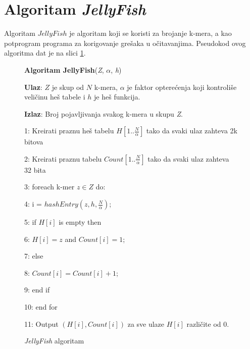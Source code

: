 \documentclass[12pt,oneside]{memoir}
\begin{document}
\section{Algoritam \textit{JellyFish}}
\label{odeljak:JellyFish}

Algoritam $JellyFish$ je algoritam koji se koristi za brojanje k-mera, a kao potprogram programa za korigovanje grešaka u očitavanjima. Pseudokod ovog algoritma dat je na slici \ref{box:jellyfish}.

\begin{comment}

\begin{figure}[!ht]
  \centering
  \texttt{[image: Jellyfish.PNG]}
  \caption{Algoritam Jellyfish \cite{WingKinSung}}
  \label{fig:jellyfish}
\end{figure}

\end{comment}

\begin{figure}[!ht]
\begin{tcolorbox}
\textbf{Algoritam JellyFish}(\textit{Z}, $\alpha$, \textit{h})

\textbf{Ulaz}: $Z$ je skup od $N$ k-mera, $\alpha$ je faktor opterećenja koji kontroliše veličinu heš tabele i $h$ je heš funkcija.

\textbf{Izlaz}: Broj pojavljivanja svakog k-mera u skupu \textit{Z}.

1: Kreirati praznu heš tabelu $H[1..\frac{N}{\alpha}]$ tako da svaki ulaz zahteva 2k bitova

2: Kreirati praznu tabelu $Count[1..\frac{N}{\alpha}]$ tako da svaki ulaz zahteva 32 bita 

3: foreach k-mer $z \in Z$ do:

4:\hspace{1cm} i = $hashEntry(z, h, \frac{N}{\alpha})$;
    
5:\hspace{1cm} if $H[i]$ is empty then

6:\hspace{2cm} $H[i] = z$ and $Count[i] = 1$;

7:\hspace{1cm} else 

8:\hspace{2cm} $Count[i] = Count[i] + 1$;

9:\hspace{1cm} end if

10: end for

11: Output $(H[i], Count[i])$ za sve ulaze $H[i]$ različite od 0.
\end{tcolorbox}
\caption{\textit{JellyFish} algoritam \cite{WingKinSung}}
\label{box:jellyfish}
\end{figure}
\end{document}

